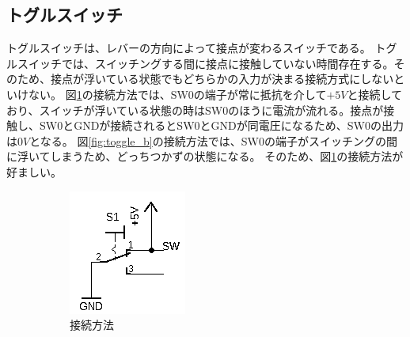 \documentclass[a4paper,11pt]{ltjsarticle}
\begin{document}
\subsection{トグルスイッチ}
トグルスイッチは、レバーの方向によって接点が変わるスイッチである。
トグルスイッチでは、スイッチングする間に接点に接触していない時間存在する。そのため、接点が浮いている状態でもどちらかの入力が決まる接続方式にしないといけない。
図\ref{fig:toggle_a}の接続方法では、SW0の端子が常に抵抗を介して$+5V$と接続しており、スイッチが浮いている状態の時はSW0のほうに電流が流れる。接点が接触し、SW0とGNDが接続されるとSW0とGNDが同電圧になるため、SW0の出力は$0V$となる。
図\ref{fig:toggle_b}の接続方法では、SW0の端子がスイッチングの間に浮いてしまうため、どっちつかずの状態になる。
そのため、図\ref{fig:toggle_a}の接続方法が好ましい。
\begin{figure}[htbp]
  \centering
  \begin{subfigure}{0.4\columnwidth}
    \centering
    \includegraphics[width=0.8\columnwidth]{./image/toggle_a.png}
    \caption{接続方法}
    \label{fig:toggle_a}
  \end{subfigure}
  \begin{subfigure}{0.4\columnwidth}
    \centering

\end{subfigure}
\end{figure}
\end{document}
